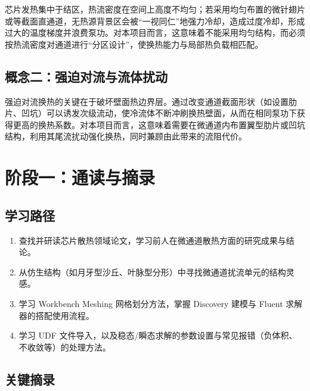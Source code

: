 \documentclass[stage1]{ydzjreport}
\begin{document}
芯片发热集中于结区，热流密度在空间上高度不均匀；若采用均匀布置的微针翅片或等截面直通道，无热源背景区会被“一视同仁”地强力冷却，造成过度冷却，形成过大的温度梯度并浪费泵功。对本项目而言，这意味着不能采用均匀结构，而必须按热流密度对通道进行“分区设计”，使换热能力与局部热负载相匹配。

\subsection{概念二：强迫对流与流体扰动}

强迫对流换热的关键在于破坏壁面热边界层。通过改变通道截面形状（如设置肋片、凹坑）可以诱发次级流动，使冷流体不断冲刷换热壁面，从而在相同泵功下获得更高的换热系数。对本项目而言，这意味着需要在微通道内布置翼型肋片或凹坑结构，利用其尾流扰动强化换热，同时兼顾由此带来的流阻代价。


\section{阶段一：通读与摘录}

\subsection{学习路径}

\begin{enumerate}
  \item 查找并研读芯片散热领域论文，学习前人在微通道散热方面的研究成果与结论。
  \item 从仿生结构（如月牙型沙丘、叶脉型分形）中寻找微通道扰流单元的结构灵感。
  \item 学习 Workbench Meshing 网格划分方法，掌握 Discovery 建模与 Fluent 求解器的搭配使用流程。
  \item 学习 UDF 文件导入，以及稳态/瞬态求解的参数设置与常见报错（负体积、不收敛等）的处理方法。
\end{enumerate}

\subsection{关键摘录}
\end{document}
